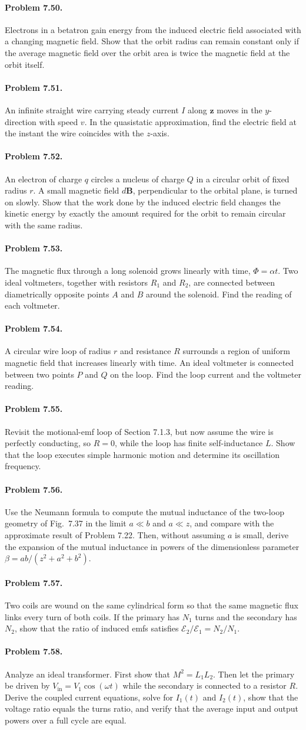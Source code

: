 \documentclass{aa}
\newcommand{\problemstatement}[2]{%
\paragraph{Problem #1.}#2\par\medskip
}
\begin{document}
\problemstatement{7.50}{Electrons in a betatron gain energy from the induced electric field associated with a changing magnetic field. Show that the orbit radius can remain constant only if the average magnetic field over the orbit area is twice the magnetic field at the orbit itself.}
\problemstatement{7.51}{An infinite straight wire carrying steady current \(I\) along \( \hat{\mathbf z}\) moves in the \(y\)-direction with speed \(v\). In the quasistatic approximation, find the electric field at the instant the wire coincides with the \(z\)-axis.}
\problemstatement{7.52}{An electron of charge \(q\) circles a nucleus of charge \(Q\) in a circular orbit of fixed radius \(r\). A small magnetic field \(d\mathbf B\), perpendicular to the orbital plane, is turned on slowly. Show that the work done by the induced electric field changes the kinetic energy by exactly the amount required for the orbit to remain circular with the same radius.}
\problemstatement{7.53}{The magnetic flux through a long solenoid grows linearly with time, \( \Phi=\alpha t\). Two ideal voltmeters, together with resistors \(R_1\) and \(R_2\), are connected between diametrically opposite points \(A\) and \(B\) around the solenoid. Find the reading of each voltmeter.}
\problemstatement{7.54}{A circular wire loop of radius \(r\) and resistance \(R\) surrounds a region of uniform magnetic field that increases linearly with time. An ideal voltmeter is connected between two points \(P\) and \(Q\) on the loop. Find the loop current and the voltmeter reading.}
\problemstatement{7.55}{Revisit the motional-emf loop of Section 7.1.3, but now assume the wire is perfectly conducting, so \(R=0\), while the loop has finite self-inductance \(L\). Show that the loop executes simple harmonic motion and determine its oscillation frequency.}
\problemstatement{7.56}{Use the Neumann formula to compute the mutual inductance of the two-loop geometry of Fig.~7.37 in the limit \(a\ll b\) and \(a\ll z\), and compare with the approximate result of Problem 7.22. Then, without assuming \(a\) is small, derive the expansion of the mutual inductance in powers of the dimensionless parameter \(\beta=ab/(z^2+a^2+b^2)\).}
\problemstatement{7.57}{Two coils are wound on the same cylindrical form so that the same magnetic flux links every turn of both coils. If the primary has \(N_1\) turns and the secondary has \(N_2\), show that the ratio of induced emfs satisfies \( \mathcal E_2/\mathcal E_1=N_2/N_1\).}
\problemstatement{7.58}{Analyze an ideal transformer. First show that \(M^2=L_1L_2\). Then let the primary be driven by \(V_{\mathrm{in}}=V_1\cos(\omega t)\) while the secondary is connected to a resistor \(R\). Derive the coupled current equations, solve for \(I_1(t)\) and \(I_2(t)\), show that the voltage ratio equals the turns ratio, and verify that the average input and output powers over a full cycle are equal.}
\end{document}
